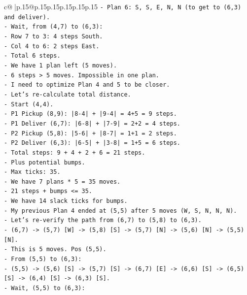 \documentclass{article}
\begin{document}
{\begin{supertabular}{c@{$\;$}|p{.15\linewidth}@{}p{.15\linewidth}p{.15\linewidth}p{.15\linewidth}p{.15\linewidth}p{.15\linewidth}}
{{{\texttt{{-} Plan 6: S, S, E, N, N (to get to (6,3) and deliver).} \\
\texttt{{-} Wait, from (4,7) to (6,3):} \\
\texttt{{-} Row 7 to 3: 4 steps South.} \\
\texttt{{-} Col 4 to 6: 2 steps East.} \\
\texttt{{-} Total 6 steps.} \\
\texttt{{-} We have 1 plan left (5 moves).} \\
\texttt{{-} 6 steps > 5 moves. Impossible in one plan.} \\
\texttt{{-} I need to optimize Plan 4 and 5 to be closer.} \\
\texttt{{-} Let's re{-}calculate total distance.} \\
\texttt{{-} Start (4,4).} \\
\texttt{{-} P1 Pickup (8,9): |8{-}4| + |9{-}4| = 4+5 = 9 steps.} \\
\texttt{{-} P1 Deliver (6,7): |6{-}8| + |7{-}9| = 2+2 = 4 steps.} \\
\texttt{{-} P2 Pickup (5,8): |5{-}6| + |8{-}7| = 1+1 = 2 steps.} \\
\texttt{{-} P2 Deliver (6,3): |6{-}5| + |3{-}8| = 1+5 = 6 steps.} \\
\texttt{{-} Total steps: 9 + 4 + 2 + 6 = 21 steps.} \\
\texttt{{-} Plus potential bumps.} \\
\texttt{{-} Max ticks: 35.} \\
\texttt{{-} We have 7 plans * 5 = 35 moves.} \\
\texttt{{-} 21 steps + bumps <= 35.} \\
\texttt{{-} We have 14 slack ticks for bumps.} \\
\texttt{{-} My previous Plan 4 ended at (5,5) after 5 moves (W, S, N, N, N).} \\
\texttt{{-} Let's re{-}verify the path from (6,7) to (5,8) to (6,3).} \\
\texttt{{-} (6,7) {-}> (5,7) {[}W{]} {-}> (5,8) {[}S{]} {-}> (5,7) {[}N{]} {-}> (5,6) {[}N{]} {-}> (5,5) {[}N{]}.} \\
\texttt{{-} This is 5 moves. Pos (5,5).} \\
\texttt{{-} From (5,5) to (6,3):} \\
\texttt{{-} (5,5) {-}> (5,6) {[}S{]} {-}> (5,7) {[}S{]} {-}> (6,7) {[}E{]} {-}> (6,6) {[}S{]} {-}> (6,5) {[}S{]} {-}> (6,4) {[}S{]} {-}> (6,3) {[}S{]}.} \\
\texttt{{-} Wait, (5,5) to (6,3):} \\
}}}
\end{supertabular}}
\end{document}
